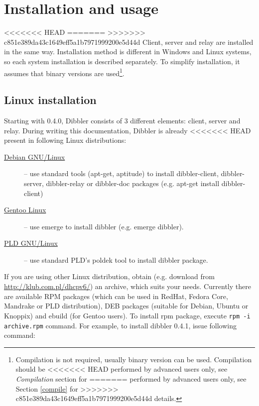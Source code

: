 
\newpage
\section{Installation and usage}
<<<<<<< HEAD
=======
\label{install}
>>>>>>> c851e389da43c1649eff5a1b7971999200e5d44d
Client, server and relay are installed in the same way. Installation
method is different in Windows and Linux systems, so each system
installation is described separately. To simplify installation, it
assumes that binary versions are used\footnote{Compilation is not
required, usually binary version can be used. Compilation should be
<<<<<<< HEAD
performed by advanced users only, see \emph{Compilation} section for
=======
performed by advanced users only, see Section \ref{compile} for
>>>>>>> c851e389da43c1649eff5a1b7971999200e5d44d
details.}.

\subsection{Linux installation}
Starting with 0.4.0, Dibbler consists of 3 different elements: client,
server and relay. During writing this documentation, Dibbler is already
<<<<<<< HEAD
present in following Linux distributions:
\begin{description}
 \item[\href{http://debian.org}{Debian GNU/Linux}] -- use standard tools
 (apt-get, aptitude) to install dibbler-client, dibbler-server,
 dibbler-relay or dibbler-doc packages (e.g. apt-get install dibbler-client)
 \item[\href{http://www.gentoo.org}{Gentoo Linux}] -- use emerge to
 install dibbler (e.g. emerge dibbler).
 \item[\href{http://www.pld-linux.org}{PLD GNU/Linux}] -- use standard
  PLD's poldek tool to install dibbler package.
\end{description}

If you are using other Linux distribution, obtain (e.g. download from
\url{http://klub.com.pl/dhcpv6/}) an archive, which suits your
needs. Currently there are available RPM packages
(which can be used in RedHat, Fedora Core, Mandrake or PLD
distribution), DEB packages (suitable for Debian, Ubuntu or Knoppix) and
ebuild (for Gentoo users). To install rpm package, execute
\verb+rpm -i archive.rpm+ command. For example, to install dibbler 0.4.1,
issue following command:

